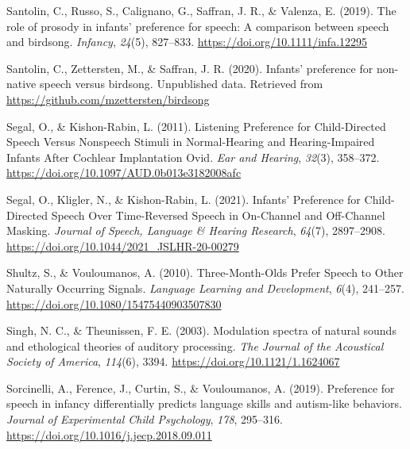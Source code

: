 \documentclass[
  man,mask,floatsintext]{apa6}
\newlength{\cslhangindent}
\newlength{\cslentryspacingunit} %
\newenvironment{CSLReferences}[2] %
 {%
  \setlength{\parindent}{0pt}
  \ifodd #1
  \let\oldpar\par
  \def\par{\hangindent=\cslhangindent\oldpar}
  \fi
  \setlength{\parskip}{#2\cslentryspacingunit}
 }%
 {}
\begin{document}
\begin{CSLReferences}{1}{0}
\leavevmode{}%
Santolin, C., Russo, S., Calignano, G., Saffran, J. R., \& Valenza, E. (2019). The role of prosody in infants' preference for speech: {A} comparison between speech and birdsong. \emph{Infancy}, \emph{24}(5), 827--833. \url{https://doi.org/10.1111/infa.12295}

\leavevmode{}%
Santolin, C., Zettersten, M., \& Saffran, J. R. (2020). Infants' preference for non-native speech versus birdsong. {Unpublished} data. Retrieved from \url{https://github.com/mzettersten/birdsong}

\leavevmode{}%
Segal, O., \& Kishon-Rabin, L. (2011). Listening {Preference} for {Child}-{Directed} {Speech} {Versus} {Nonspeech} {Stimuli} in {Normal}-{Hearing} and {Hearing}-{Impaired} {Infants} {After} {Cochlear} {Implantation} {\textbar} {Ovid}. \emph{Ear and Hearing}, \emph{32}(3), 358--372. \url{https://doi.org/10.1097/AUD.0b013e3182008afc}

\leavevmode{}%
Segal, O., Kligler, N., \& Kishon-Rabin, L. (2021). Infants' {Preference} for {Child}-{Directed} {Speech} {Over} {Time}-{Reversed} {Speech} in {On}-{Channel} and {Off}-{Channel} {Masking}. \emph{Journal of Speech, Language \& Hearing Research}, \emph{64}(7), 2897--2908. \url{https://doi.org/10.1044/2021_JSLHR-20-00279}

\leavevmode{}%
Shultz, S., \& Vouloumanos, A. (2010). Three-{Month}-{Olds} {Prefer} {Speech} to {Other} {Naturally} {Occurring} {Signals}. \emph{Language Learning and Development}, \emph{6}(4), 241--257. \url{https://doi.org/10.1080/15475440903507830}

\leavevmode{}%
Singh, N. C., \& Theunissen, F. E. (2003). Modulation spectra of natural sounds and ethological theories of auditory processing. \emph{The Journal of the Acoustical Society of America}, \emph{114}(6), 3394. \url{https://doi.org/10.1121/1.1624067}

\leavevmode{}%
Sorcinelli, A., Ference, J., Curtin, S., \& Vouloumanos, A. (2019). Preference for speech in infancy differentially predicts language skills and autism-like behaviors. \emph{Journal of Experimental Child Psychology}, \emph{178}, 295--316. \url{https://doi.org/10.1016/j.jecp.2018.09.011}


\end{CSLReferences}
\end{document}
